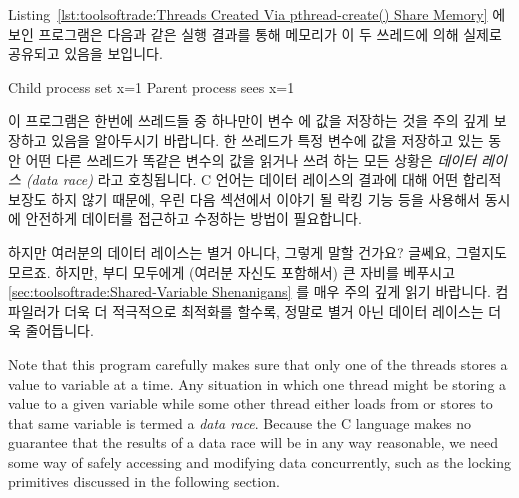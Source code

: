 Listing~\ref{lst:toolsoftrade:Threads Created Via pthread-create() Share Memory}
에 보인 프로그램은 다음과 같은 실행 결과를 통해 메모리가 이 두 쓰레드에 의해
실제로 공유되고 있음을 보입니다.

\begin{VerbatimU}
Child process set x=1
Parent process sees x=1
\end{VerbatimU}

이 프로그램은 한번에 쓰레드들 중 하나만이 변수  에 값을 저장하는 것을
주의 깊게 보장하고 있음을 알아두시기 바랍니다.
한 쓰레드가 특정 변수에 값을 저장하고 있는 동안 어떤 다른 쓰레드가 똑같은
변수의 값을 읽거나 쓰려 하는 모든 상황은 \emph{데이터 레이스 (data race)} 라고
호칭됩니다.
C 언어는 데이터 레이스의 결과에 대해 어떤 합리적 보장도 하지 않기 때문에, 우린
다음 섹션에서 이야기 될 락킹 기능 등을 사용해서 동시에 안전하게 데이터를
접근하고 수정하는 방법이 필요합니다.

하지만 여러분의 데이터 레이스는 별거 아니다, 그렇게 말할 건가요?
글쎄요, 그럴지도 모르죠.
하지만, 부디 모두에게 (여러분 자신도 포함해서) 큰 자비를 베푸시고
\cref{sec:toolsoftrade:Shared-Variable Shenanigans}
를 매우 주의 깊게 읽기 바랍니다.
컴파일러가 더욱 더 적극적으로 최적화를 할수록, 정말로 별거 아닌 데이터 레이스는
더욱 줄어듭니다.

\iffalse

Note that this program carefully makes sure that only one of the threads
stores a value to variable  at a time.
Any situation in which one thread might be storing a value to a given
variable while some other thread either loads from or stores to that
same variable is termed a \emph{data race}.
Because the C language makes no guarantee that the results of a data race
will be in any way reasonable, we need some way of safely accessing
and modifying data concurrently, such as the locking primitives discussed
in the following section.


